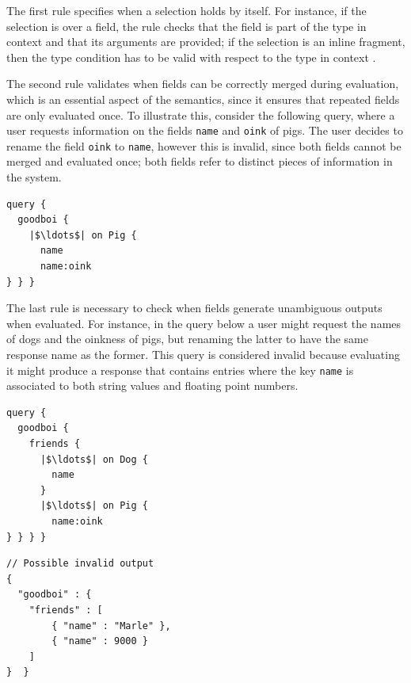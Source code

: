 The first rule specifies when a selection holds by itself. For instance, if the selection is over a field, the rule checks that the field is part of the type in context and that its arguments are provided; if the selection is an inline fragment, then the type condition has to be valid with respect to the type in context .%

The second rule validates when fields can be correctly merged during evaluation, which is an essential aspect of the semantics, since it ensures that repeated fields are only evaluated once. To illustrate this, consider the following query, where a user requests information on the fields \texttt{name} and \texttt{oink} of pigs. The user decides to rename the field \texttt{oink} to \texttt{name}, however this is invalid, since both fields cannot be merged and evaluated once; both fields refer to distinct pieces of information in the system.

\begin{verbatim}
query {
  goodboi {
    |$\ldots$| on Pig {
	  name
	  name:oink
} } }
\end{verbatim}

The last rule is necessary to check when fields generate unambiguous outputs when evaluated. For instance, in the query below a user might request the names of dogs and the oinkness of pigs, but renaming the latter to have the same response name as the former. This query is considered invalid because evaluating it might produce a response that contains entries where the key \texttt{name} is associated to both string values and floating point numbers. 

\begin{minipage}[t]{.22\textwidth}
\begin{verbatim}
query {
  goodboi {
    friends {
      |$\ldots$| on Dog {
        name
      }
      |$\ldots$| on Pig {
        name:oink
} } } }
\end{verbatim}
\end{minipage}%
\begin{minipage}[t]{.22\textwidth}
\begin{verbatim}
// Possible invalid output
{
  "goodboi" : {
    "friends" : [
        { "name" : "Marle" },
        { "name" : 9000 }
    ]
}  }
\end{verbatim}
\end{minipage}



